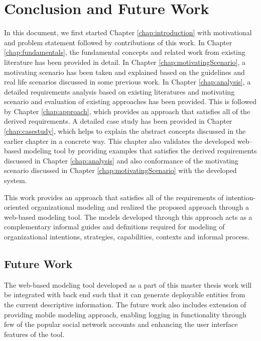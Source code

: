\chapter{Conclusion and Future Work}
\label{chap:conclusion}

In this document, we first started Chapter \ref{chap:introduction} with motivational and problem statement followed by contributions of this work. In Chapter \ref{chap:fundamentals}, the fundamental concepts and related work from existing literature has been provided in detail. In Chapter \ref{chap:motivatingScenario}, a motivating scenario has been taken and explained based on the guidelines and real life scenarios discussed in some previous work. In Chapter \ref{chap:analysis}, a detailed requirements analysis based on existing literatures and motivating scenario and evaluation of existing approaches has been provided. This is followed by Chapter \ref{chap:approach}, which provides an approach that satisfies all of the derived requirements. A detailed case study has been provided in Chapter \ref{chap:casestudy}, which helps to explain the abstract concepts discussed in the earlier chapter in a concrete way. This chapter also validates the developed web–based modeling tool by providing examples that satisfies the derived requirements discussed in Chapter \ref{chap:analysis} and also conformance of the motivating scenario discussed in Chapter \ref{chap:motivatingScenario} with the developed system.

This work provides an approach that satisfies all of the requirements of intention-oriented organizational modeling and realized the proposed approach through a web-based modeling tool. The models developed through this approach acts as a complementary informal guides and definitions required for modeling of organizational intentions, strategies, capabilities, contexts and informal process. 

\section*{Future Work}
\label{sec:futurework}
The web-based modeling tool developed as a part of this master thesis work will be integrated with back end such that it can generate deployable entities from the current descriptive information. The future work also includes extension of providing mobile modeling approach, enabling logging in functionality through few of the popular social network accounts and enhancing the user interface features of the tool. 






